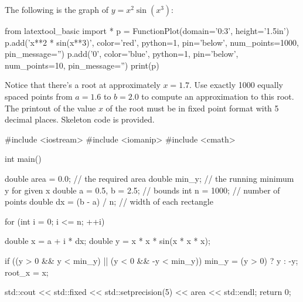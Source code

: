 \nextq
The following is the graph of $y = x^2 \sin(x^3)$:
\begin{python}
from latextool_basic import *
p = FunctionPlot(domain='0:3', height='1.5in')
p.add('x**2 * sin(x**3)', color='red', python=1, pin='below', num_points=1000,
pin_message='')
p.add('0', color='blue', python=1, pin='below', num_points=10,
pin_message='')
print(p)
\end{python}
Notice that there's a root at approximately $x = 1.7$.
Use exactly 1000 equally spaced points from $a = 1.6$ to $b = 2.0$ to
compute an approximation to this root.
The printout of the value $x$ of the root
must be in fixed point format with 5 decimal places.
Skeleton code is provided.
\\
\ANSWER
\begin{answercode}
#include <iostream>
#include <iomanip>
#include <cmath>

int main()
{
    double area = 0.0;                // the required area
    double min_y;                     // the running minimum y for given x 
    double a = 0.5, b = 2.5;          // bounds
    int n = 1000;                     // number of points
    double dx = (b - a) / n;          // width of each rectangle

     for (int i = 0; i <= n; ++i)
    {
        double x = a + i * dx;        
        double y = x * x * sin(x * x * x); 

        if ((y > 0 && y < min_y) || (y < 0 && -y < min_y)) 
        {
            min_y = (y > 0) ? y : -y;
            root_x = x;
        }
    }

    std::cout << std::fixed << std::setprecision(5) << area << std::endl;
    return 0;
}

\end{answercode}


